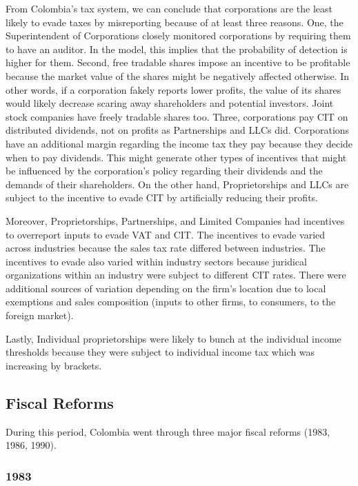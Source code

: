 \documentclass[
  12pt]{article}
\theoremstyle{definition}
\theoremstyle{remark}
\begin{document}
From Colombia's tax system, we can conclude that corporations are the
least likely to evade taxes by misreporting because of at least three
reasons. One, the Superintendent of Corporations closely monitored
corporations by requiring them to have an auditor. In the model, this
implies that the probability of detection is higher for them. Second,
free tradable shares impose an incentive to be profitable because the
market value of the shares might be negatively affected otherwise. In
other words, if a corporation fakely reports lower profits, the value of
its shares would likely decrease scaring away shareholders and potential
investors. Joint stock companies have freely tradable shares too. Three,
corporations pay CIT on distributed dividends, not on profits as
Partnerships and LLCs did. Corporations have an additional margin
regarding the income tax they pay because they decide when to pay
dividends. This might generate other types of incentives that might be
influenced by the corporation's policy regarding their dividends and the
demands of their shareholders. On the other hand, Proprietorships and
LLCs are subject to the incentive to evade CIT by artificially reducing
their profits.

Moreover, Proprietorships, Partnerships, and Limited Companies had
incentives to overreport inputs to evade VAT and CIT. The incentives to
evade varied across industries because the sales tax rate differed
between industries. The incentives to evade also varied within industry
sectors because juridical organizations within an industry were subject
to different CIT rates. There were additional sources of variation
depending on the firm's location due to local exemptions and sales
composition (inputs to other firms, to consumers, to the foreign
market).

Lastly, Individual proprietorships were likely to bunch at the
individual income thresholds because they were subject to individual
income tax which was increasing by brackets.

\subsection{Fiscal Reforms}\label{fiscal-reforms}

During this period, Colombia went through three major fiscal reforms
(1983, 1986, 1990).

\subsubsection{1983}\label{section}
\end{document}
